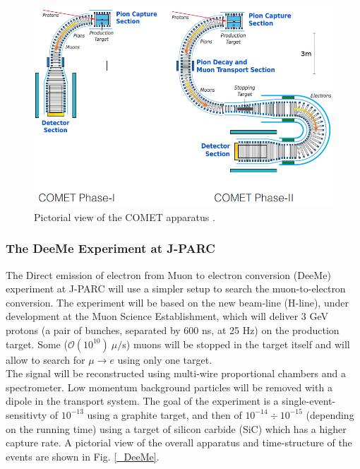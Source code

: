 \documentclass[12pt,a4paper,openright, oneside, titlepage]{book} %
\begin{document}
\begin{figure}[h!]
\centering
\includegraphics[scale=0.8]{COMET}
\caption[COMET experiment]{Pictorial view of the COMET apparatus \cite{COMET_I}.}
\label{_COMET}
\end{figure}

\subsubsection{The DeeMe Experiment at J-PARC}
The Direct emission of electron from Muon to electron conversion (DeeMe) \cite{DeeMe} experiment at J-PARC will use a simpler setup to search the muon-to-electron conversion. 
The experiment will be based on the new beam-line (H-line), under development at the Muon Science Establishment, which will deliver 3 GeV protons (a pair of bunches, separated by 600 ns, at 25 Hz) on the production target. 
Some ($\mathcal{O}(10^{10})\ \mu/$s) muons will be stopped in the target itself and will allow to search for $\mu\rightarrow e$ using only one target. \\
The signal will be reconstructed using multi-wire proportional chambers and a spectrometer. 
Low momentum background particles will be removed with a dipole in the transport system. 
The goal of the experiment is a single-event-sensitivty of $10^{-13}$ using a graphite target,
 and then of  $10^{-14}\div10^{-15}$ (depending on the running time) using a target of silicon carbide (SiC) 
 which has a higher capture rate. 
A pictorial view of the overall apparatus and time-structure of the events 
are shown in Fig. \ref{_DeeMe}.
\end{document}

